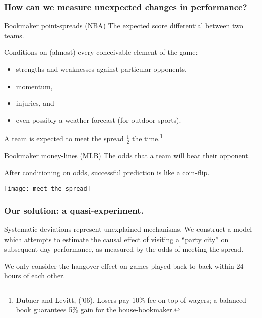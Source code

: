 \documentclass{beamer}
\begin{document}
\begin{frame}
  \frametitle{How can we measure unexpected changes in performance?}     
  \begin{block}{Bookmaker point-spreads (NBA)}     
    The expected score differential between two teams.

    Conditions on (almost) every conceivable element of the game:
    \begin{itemize}     
      \item strengths and weaknesses against particular opponents,
      \item momentum,
      \item injuries, and
      \item even possibly a weather forecast (for outdoor sports).     
    \end{itemize}

    A team is expected to meet the spread $\frac{1}{2}$ the time.\footnote{Dubner and Levitt, ('06). Losers pay 10\% fee on top of wagers; a balanced book guarantees 5\% gain for the house-bookmaker.}
  \end{block}
  \vspace{12pt}
  \begin{block}{Bookmaker money-lines (MLB)}     
    The odds that a team will beat their opponent.

    After conditioning on odds, successful prediction is like a coin-flip. 
  \end{block} 
\end{frame}

\begin{frame}
  \centering   \texttt{[image: meet\_the\_spread]} 
\end{frame}


\begin{frame}   \frametitle{Our solution: a quasi-experiment.}
  \begin{block}{Systematic deviations represent unexplained mechanisms.}     We construct a model which attempts to estimate the causal effect of visiting a ``party city''
    on subsequent day performance, as measured by the odds of meeting the spread.       \end{block}

  \begin{block}{}     We only consider the hangover effect on games played back-to-back within 24 hours of each other.   
  \end{block} 
\end{frame}
\end{document}
